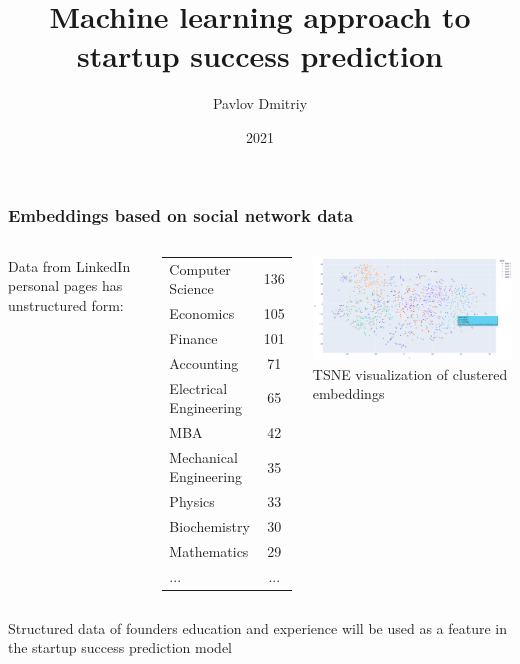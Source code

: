 \documentclass[8pt]{beamer}
\title{\huge{Machine learning approach to startup success prediction}}
\author{Pavlov Dmitriy}
\institute{Moscow Institute of Physics and Technology}
\date{2021}
\begin{document}


\begin{frame}
    \frametitle{Embeddings based on social network data}
    
    
    
    \begin{columns}
        
        Data from LinkedIn personal pages has unstructured form:
        
        \begin{center}
            \begin{tabular}{ l c }
            Computer Science                                  & 136 \\
            Economics                                         & 105 \\ 
            Finance                                           & 101 \\
            Accounting                                        &  71 \\ 
            Electrical Engineering                            &  65 \\ 
            MBA   &  42 \\ 
            Mechanical Engineering                            &  35 \\ 
            Physics                                           &  33 \\ 
            Biochemistry                                      &  30 \\ 
            Mathematics                                       &  29 \\
            ...                                               & ... \\
            \end{tabular}
        \end{center}
    
    
       \includegraphics[width=7cm]{figures/paper/kMeans-16-03.png}
        TSNE visualization of clustered embeddings
    \end{columns}
    
    Structured data of founders education and experience will be used as a feature in the startup success prediction model 
    
\end{frame}


\end{document}
